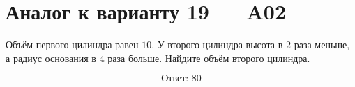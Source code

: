 \documentclass[12pt,a4paper]{article}
\begin{document}
\section*{Аналог к варианту 19 — A02}

Объём первого цилиндра равен \(10\). У второго цилиндра высота в \(2\) раза меньше, а радиус основания в \(4\) раза больше. Найдите объём второго цилиндра.

\begin{center}
\end{center}

\[
\boxed{\text{Ответ: }80}
\]
\end{document}

